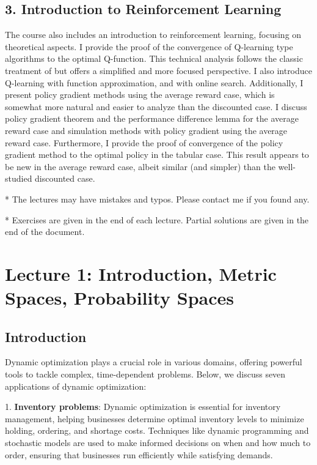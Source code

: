 \documentclass[letter,11pt]{article}
\begin{document}
\subsection*{3. Introduction to Reinforcement Learning}

The course also includes an introduction to reinforcement learning, focusing on  theoretical aspects. I provide the proof of the convergence of Q-learning type algorithms to the optimal Q-function.  This technical analysis follows the classic treatment of \cite{bertsekas1996neuro} but offers a simplified and more focused perspective. I also introduce Q-learning with function approximation, and with online search. Additionally, I present policy gradient methods using the average reward case, which is somewhat more natural and easier to analyze  than the discounted case. I discuss policy gradient theorem and the performance difference lemma for the average reward case and simulation methods with policy gradient using the average reward case. Furthermore, I provide the proof of convergence of the policy gradient method to the optimal policy in the tabular case. This result appears to be new in the average reward case, albeit similar (and simpler) than the well-studied discounted case.

\vspace{3mm}

* The lectures may have mistakes and typos. Please contact me if you found any.


* Exercises are given in the end of each lecture. Partial solutions are given in the end of the document. 
\newpage

\tableofcontents

\newpage 



\section{Lecture 1: Introduction, Metric Spaces, Probability Spaces}
 

\subsection{Introduction}


Dynamic optimization plays a crucial role in various domains, offering powerful tools to tackle complex, time-dependent problems. Below, we discuss seven applications of dynamic optimization:


1. \textbf{Inventory problems}: Dynamic optimization is essential for inventory management, helping businesses determine optimal inventory levels to minimize holding, ordering, and shortage costs. Techniques like dynamic programming and stochastic models are used to make informed decisions on when and how much to order, ensuring that businesses run efficiently while satisfying demands.
\end{document}
